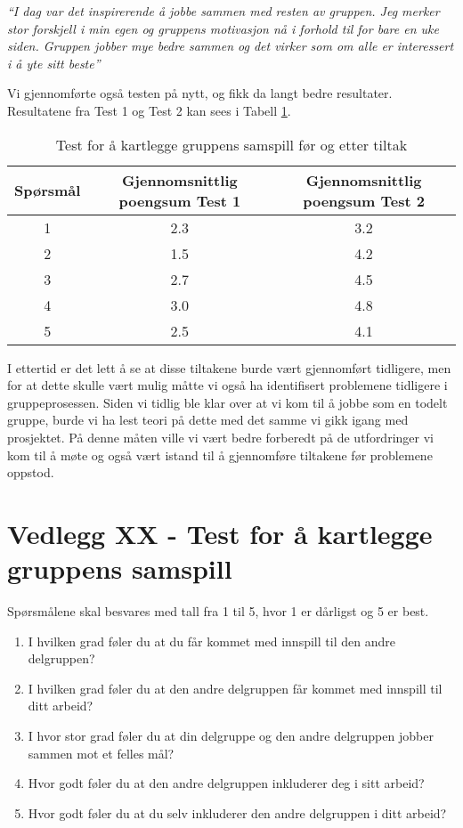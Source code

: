 \emph{``I dag var det inspirerende å jobbe sammen med resten av gruppen. Jeg merker stor forskjell i min egen og gruppens motivasjon nå i forhold til for bare en uke siden. Gruppen jobber mye bedre sammen og det virker som om alle er interessert i å yte sitt beste''}\newline

Vi gjennomførte også testen på nytt, og fikk da langt bedre resultater. Resultatene fra Test 1 og Test 2 kan sees i Tabell \ref{Test}. \newline

\begin{table}[h]
\begin{center}
\begin{tabular}{| c | c | c | }
\hline
Spørsmål & Gjennomsnittlig poengsum Test 1 & Gjennomsnittlig poengsum Test 2 \\ \hline
1 & 2.3 & 3.2 \\ \hline
2 & 1.5 & 4.2 \\ \hline
3 & 2.7 & 4.5 \\ \hline
4 & 3.0 & 4.8 \\ \hline
5 & 2.5 & 4.1 \\ \hline
\end{tabular}
\caption{Test for å kartlegge gruppens samspill før og etter tiltak}
\label{Test}
\end{center}
\end{table}

I ettertid er det lett å se at disse tiltakene burde vært gjennomført tidligere, men for at dette skulle vært mulig måtte vi også ha identifisert problemene tidligere i gruppeprosessen. Siden vi tidlig ble klar over at vi kom til å jobbe som en todelt gruppe, burde vi ha lest teori på dette med det samme vi gikk igang med prosjektet. På denne måten ville vi vært bedre forberedt på de utfordringer vi kom til å møte og også vært istand til å gjennomføre tiltakene før problemene oppstod.

\section{Vedlegg XX - Test for å kartlegge gruppens samspill}
Spørsmålene skal besvares med tall fra 1 til 5, hvor 1 er dårligst og 5 er best.\newline
\begin{enumerate}
\item I hvilken grad  føler du at du får kommet med innspill til den andre delgruppen?
\item I hvilken grad føler du at den andre delgruppen får kommet med innspill til ditt arbeid?
\item I hvor stor grad føler du at din delgruppe og den andre delgruppen jobber sammen mot et felles mål?
\item Hvor godt føler du at den andre delgruppen inkluderer deg i sitt arbeid?
\item Hvor godt føler du at du selv inkluderer den andre delgruppen i ditt arbeid?
\end{enumerate}



